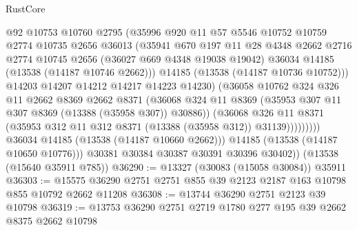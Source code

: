 \begin{lexlean}{RustCore}
\begin{coremodule}
                          @92
                          @10753
                          @10760
                          @2795
                          (@35996
                            @920
                            @11
                            @57
                            @5546
                            @10752
                            @10759
                            @2774
                            @10735
                            @2656
                            @36013
                            (@35941
                              @670
                              @197
                              @11
                              @28
                              @4348
                              @2662
                              @2716
                              @2774
                              @10745
                              @2656
                              (@36027 @669 @4348 @19038 @19042)
                              @36034
                              @14185
                              (@13538 (@14187 @10746 @2662)))
                            @14185
                            (@13538 (@14187 @10736 @10752)))
                          @14203
                          @14207
                          @14212
                          @14217
                          @14223
                          @14230)
                        (@36058
                          @10762
                          @324
                          @326
                          @11
                          @2662
                          @8369
                          @2662
                          @8371
                          (@36068
                            @324
                            @11
                            @8369
                            (@35953 @307 @11 @307 @8369 (@13388 (@35958 @307)) @30886))
                          (@36068
                            @326
                            @11
                            @8371
                            (@35953 @312 @11 @312 @8371 (@13388 (@35958 @312)) @31139)))))))))
            @36034
            @14185
            (@13538 (@14187 @10660 @2662)))
          @14185
          (@13538 (@14187 @10650 @10776)))
        @30381
        @30384
        @30387
        @30391
        @30396
        @30402))
    (@13538 (@15640 @35911 @785))
@36290 := @13327 (@30083 (@15058 @30084)) @35911
@36303 := @15575 @36290 @2751 @2751 @855 @39 @2123 @2187 @163 @10798 @855 @10792 @2662 @11208
@36308 := @13744 @36290 @2751 @2123 @39 @10798
@36319 := @13753 @36290 @2751 @2719 @1780 @277 @195 @39 @2662 @8375 @2662 @10798

\end{coremodule}
\end{lexlean}
